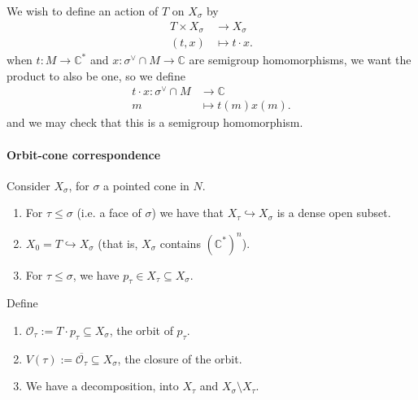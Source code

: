 \documentclass[a4paper,12pt]{amsart}
\newcommand{\CC}{\mathbb{C}}
\begin{document}
We wish to define an action of $T$ on $X_\sigma$ by 
\begin{align*}
	T \times X_\sigma &\to X_\sigma \\
	(t,x) &\mapsto t \cdot x.
\end{align*}
when $t: M \to \CC^*$ and $x: \sigma^\vee \cap M \to \CC$ are semigroup homomorphisms, we want the product to also be one, so we define
\begin{align*}
		t \cdot x: \sigma^\vee \cap M &\to \CC \\
	m &\mapsto t(m) x(m).
\end{align*}
and we may check that this is a semigroup homomorphism.

\paragraph{Orbit-cone correspondence}
Consider $X_\sigma$, for $\sigma$ a pointed cone in $N$. 
\begin{enumerate}
\item For $\tau \leq \sigma$ (i.e. a face of $\sigma$) we have that $X_\tau \hookrightarrow X_\sigma$ is a dense open subset. 
\item $X_0 = T \hookrightarrow X_\sigma$ (that is, $X_\sigma$ contains $(\CC^*)^n$).
\item For $\tau \leq \sigma$, we have $p_\tau \in X_\tau \subseteq X_\sigma$.
\end{enumerate}
Define
\begin{enumerate}
\item $\mathcal{O}_\tau := T \cdot p_\tau \subseteq X_\sigma$, the orbit of $p_\tau$.  
\item $V(\tau) := \overline{\mathcal{O}_\tau} \subseteq X_\sigma$, the closure of the orbit.
\item We have a decomposition, into $X_\tau$ and $X_\sigma \setminus X_\tau$.
\end{enumerate}
\end{document}
